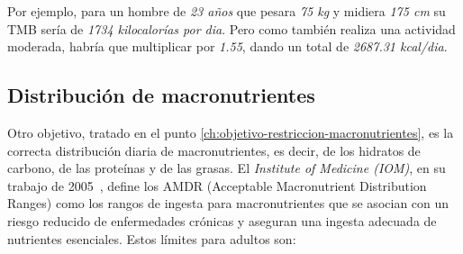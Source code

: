 Por ejemplo, para un hombre de \textit{23 años} que pesara \textit{75 kg} y midiera \textit{175 cm} su TMB sería de \textit{1734 kilocalorías por dia}. Pero como también realiza una actividad moderada, habría que multiplicar por \textit{1.55}, dando un total de \textit{2687.31 kcal/dia}.

\subsection{Distribución de macronutrientes}
\label{ch:distribucion-macronutrientes}

Otro objetivo, tratado en el punto \ref{ch:objetivo-restriccion-macronutrientes}, es la correcta distribución diaria de macronutrientes, es decir, de los hidratos de carbono, de las proteínas y de las grasas. El \textit{Institute of Medicine (IOM)}, en su trabajo de 2005~\cite{iom2005}, define los AMDR (Acceptable Macronutrient Distribution Ranges) como los rangos de ingesta para macronutrientes que se asocian con un riesgo reducido de enfermedades crónicas y aseguran una ingesta adecuada de nutrientes esenciales. Estos límites para adultos son:

